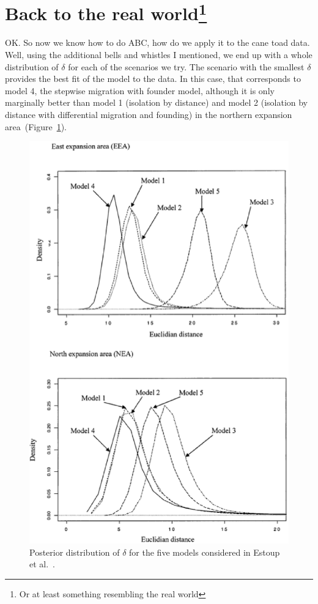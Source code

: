 \section*{Back to the real world\footnote{Or at least something
    resembling the real world}}

OK. So now we know how to do ABC, how do we apply it to the cane toad
data. Well, using the additional bells and whistles I mentioned, we
end up with a whole distribution of $\delta$ for each of the scenarios
we try. The scenario with the smallest $\delta$ provides the best fit
of the model to the data. In this case, that corresponds to model 4,
the stepwise migration with founder model, although it is only
marginally better than model 1 (isolation by distance) and model 2
(isolation by distance with differential migration and founding) in
the northern expansion area~(Figure~\ref{fig:cane-toad-models}).

\begin{figure}
\begin{center}
\includegraphics[width=4.5in]{cane-toad-models.eps}
\end{center}
\caption{Posterior distribution of $\delta$ for the five models
  considered in Estoup et al.~\cite{Estoup-etal-2004}.}\label{fig:cane-toad-models}
\end{figure}


